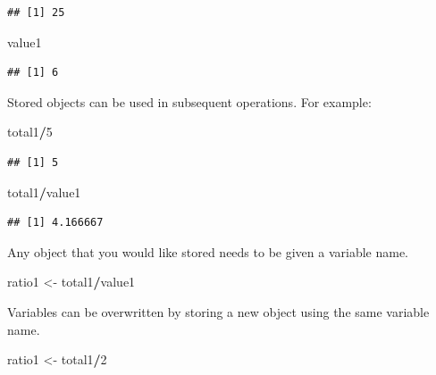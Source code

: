\documentclass[
]{book}
\newenvironment{Shaded}{\begin{snugshade}}{\end{snugshade}}
\newcommand{\DecValTok}[1]{\textcolor[rgb]{0.00,0.00,0.81}{#1}}
\newcommand{\NormalTok}[1]{#1}
\newcommand{\OtherTok}[1]{\textcolor[rgb]{0.56,0.35,0.01}{#1}}
\newcommand{\SpecialCharTok}[1]{\textcolor[rgb]{0.81,0.36,0.00}{\textbf{#1}}}
\theoremstyle{definition}
\theoremstyle{definition}
\theoremstyle{definition}
\theoremstyle{definition}
\theoremstyle{remark}
\begin{document}
\begin{verbatim}
## [1] 25
\end{verbatim}

\begin{Shaded}
\begin{Highlighting}[]
\NormalTok{value1}
\end{Highlighting}
\end{Shaded}

\begin{verbatim}
## [1] 6
\end{verbatim}

Stored objects can be used in subsequent operations. For example:

\begin{Shaded}
\begin{Highlighting}[]
\NormalTok{total1}\SpecialCharTok{/}\DecValTok{5}
\end{Highlighting}
\end{Shaded}

\begin{verbatim}
## [1] 5
\end{verbatim}

\begin{Shaded}
\begin{Highlighting}[]
\NormalTok{total1}\SpecialCharTok{/}\NormalTok{value1}
\end{Highlighting}
\end{Shaded}

\begin{verbatim}
## [1] 4.166667
\end{verbatim}

Any object that you would like stored needs to be given a variable name.

\begin{Shaded}
\begin{Highlighting}[]
\NormalTok{ratio1 }\OtherTok{\textless{}{-}}\NormalTok{ total1}\SpecialCharTok{/}\NormalTok{value1}
\end{Highlighting}
\end{Shaded}

Variables can be overwritten by storing a new object using the same variable name.

\begin{Shaded}
\begin{Highlighting}[]
\NormalTok{ratio1 }\OtherTok{\textless{}{-}}\NormalTok{ total1}\SpecialCharTok{/}\DecValTok{2}
\end{Highlighting}
\end{Shaded}
\end{document}
